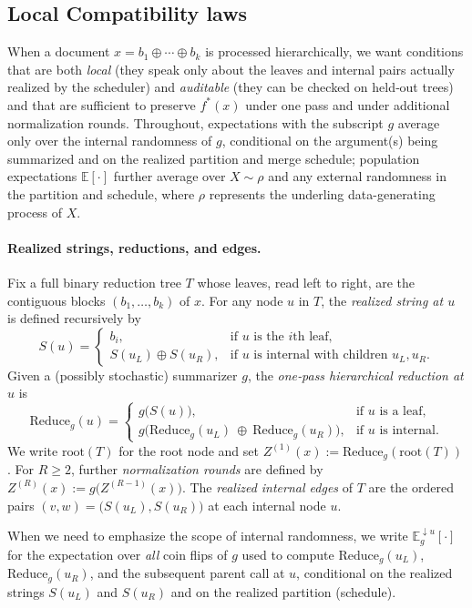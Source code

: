 \documentclass[11pt]{article}
\newcommand{\fstar}{f^*}               %
\newcommand{\E}{\mathbb{E}}
\newcommand{\concat}{\oplus}                    %
\newcommand{\Law}{\rho}
\newcommand{\reduce}{\text{Reduce}}
\newcommand{\reduceg}{\reduce_g}
\newcommand{\Eg}{\E_g}     %
\begin{document}
\subsection{Local Compatibility laws}\label{sec:compatibility}

When a document $x=b_1\concat\cdots\concat b_k$ is processed hierarchically, we want conditions that are both \emph{local} (they speak only about the leaves and internal pairs actually realized by the scheduler) and \emph{auditable} (they can be checked on held‑out trees) and that are sufficient to preserve $\fstar(x)$ under one pass and under additional normalization rounds. Throughout, expectations with the subscript $g$ average only over the internal randomness of $g$, conditional on the argument(s) being summarized and on the realized partition and merge schedule; population expectations $\E[\cdot]$ further average over $X\sim\Law$ and any external randomness in the partition and schedule, where $\Law$ represents the underling data-generating process of $X$.

\paragraph{Realized strings, reductions, and edges.}
Fix a full binary reduction tree $T$ whose leaves, read left to right, are the contiguous blocks $(b_1,\ldots,b_k)$ of $x$. For any node $u$ in $T$, the \emph{realized string at $u$} is defined recursively by
\[
S(u)=
\begin{cases}
b_i, & \text{if $u$ is the $i$th leaf},\\[2pt]
S(u_L)\concat S(u_R), & \text{if $u$ is internal with children $u_L,u_R$}.
\end{cases}
\]
Given a (possibly stochastic) summarizer $g$, the \emph{one‑pass hierarchical reduction at $u$} is
\[
\reduceg(u)=
\begin{cases}
g\!\big(S(u)\big), & \text{if $u$ is a leaf},\\[2pt]
g\!\Big(\reduceg(u_L)\ \concat\ \reduceg(u_R)\Big), & \text{if $u$ is internal}.
\end{cases}
\]
We write $\mathrm{root}(T)$ for the root node and set $Z^{(1)}(x):=\reduceg(\mathrm{root}(T))$. For $R\ge 2$, further \emph{normalization rounds} are defined by $Z^{(R)}(x):=g\!\big(Z^{(R-1)}(x)\big)$. The \emph{realized internal edges} of $T$ are the ordered pairs $(v,w)=\big(S(u_L),S(u_R)\big)$ at each internal node $u$.

When we need to emphasize the scope of internal randomness, we write $\Eg^{\downarrow u}[\cdot]$ for the expectation over \emph{all} coin flips of $g$ used to compute $\reduceg(u_L)$, $\reduceg(u_R)$, and the subsequent parent call at $u$, conditional on the realized strings $S(u_L)$ and $S(u_R)$ and on the realized partition (schedule).
\end{document}
